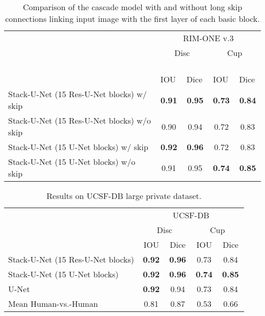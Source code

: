 \documentclass{llncs}
\begin{document}
    \begin{table}[ht!]
        	\centering
        	\begin{tabular}{l|c|c|c|c}
        		\hline
        		&
        		\multicolumn{4}{c}{\,RIM-ONE v.3\,} \\   %
        		& \multicolumn{2}{c|}{\,Disc\,}  & \multicolumn{2}{c}{\,Cup\,}  \\ 
                & \,IOU\, & \,Dice\,  & \,IOU\, & \,Dice\, \\ \hline \hline
        		Stack-U-Net (15 Res-U-Net blocks) w/ skip & \textbf{0.91} & \textbf{0.95}& \textbf{0.73} & \textbf{0.84} \\
                Stack-U-Net (15 Res-U-Net blocks) w/o skip & 0.90 & 0.94 & 0.72 & 0.83 \\ \hline
                Stack-U-Net (15 U-Net blocks) w/ skip &\textbf{0.92} & \textbf{0.96} & 0.72 & 0.83 \\
                Stack-U-Net (15 U-Net blocks) w/o skip & 0.91 & 0.95 & \textbf{0.74} & \textbf{0.85} \\ \hline
        	\end{tabular}
            \newline\newline
        	\caption{Comparison of the cascade model with and without long skip connections linking input image with the first layer of each basic block.}
            \label{table:skip_connections}
\end{table}
        
\begin{table}[ht!]
            \centering
        	\begin{tabular}{l|c|c|c|c}
        		\hline
                & \multicolumn{4}{c}{\,UCSF-DB\,} \\   
                & \multicolumn{2}{c}{\,Disc\,}  & \multicolumn{2}{|c}{\,Cup\,}  \\ 
                & \,IOU\, & \,Dice\,  & \,IOU\, & \,Dice\, \\ \hline \hline 
                Stack-U-Net (15 Res-U-Net blocks) &  \textbf{0.92} & \textbf{0.96} & 0.73  & 0.84  \\
                Stack-U-Net (15 U-Net blocks) & \textbf{0.92} & \textbf{0.96} & \textbf{0.74}  & \textbf{0.85} \\
                U-Net &  \textbf{0.92} & 0.94  &  0.73  & 0.84 \\ 
                Mean Human-vs.-Human & 0.81 & 0.87 & 0.53 & 0.66 \\ \hline
            \end{tabular}
            \newline\newline
            \caption{Results on UCSF-DB large private dataset.}
            \label{table:ucsf_results}
\end{table}
\end{document}
